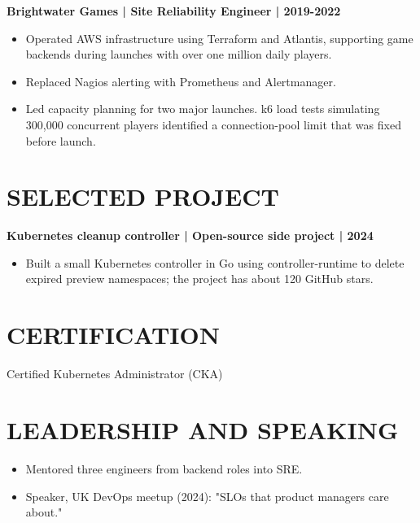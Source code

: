 \documentclass[11pt,a4paper]{article}
\begin{document}
\textbf{Brightwater Games | Site Reliability Engineer | 2019-2022}
\begin{itemize}
\item Operated AWS infrastructure using Terraform and Atlantis, supporting game backends during launches with over one million daily players.
\item Replaced Nagios alerting with Prometheus and Alertmanager.
\item Led capacity planning for two major launches. k6 load tests simulating 300,000 concurrent players identified a connection-pool limit that was fixed before launch.
\end{itemize}

\section*{SELECTED PROJECT}
\textbf{Kubernetes cleanup controller | Open-source side project | 2024}
\begin{itemize}
\item Built a small Kubernetes controller in Go using controller-runtime to delete expired preview namespaces; the project has about 120 GitHub stars.
\end{itemize}

\section*{CERTIFICATION}
Certified Kubernetes Administrator (CKA)

\section*{LEADERSHIP AND SPEAKING}
\begin{itemize}
\item Mentored three engineers from backend roles into SRE.
\item Speaker, UK DevOps meetup (2024): "SLOs that product managers care about."
\end{itemize}
\end{document}
